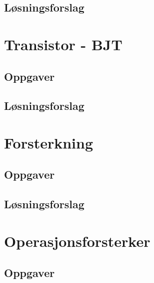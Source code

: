 \documentclass[12pt]{report}
\begin{document}
\subsection{Løsningsforslag}
\printsolutions[section]

\newpage

\section{Transistor - BJT}
\label{sec:tranBJT}

\subsection{Oppgaver}

\subsection{Løsningsforslag}
\printsolutions[section]

\newpage




\section{Forsterkning}
\label{sec:forsterk}

\subsection{Oppgaver}

\subsection{Løsningsforslag}
\printsolutions[section]

\newpage

\section{Operasjonsforsterker}
\label{sec:opamp}

\subsection{Oppgaver}

\end{document}
